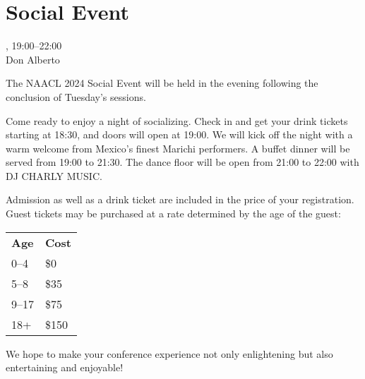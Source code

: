 \clearpage
\section{Social Event}
\setheaders{}{\daydateyear}

\begin{center}



\daydateyear, 19:00--22:00 \vspace{1em}\\
Don Alberto\\
\end{center}


The NAACL 2024 Social Event will be held in the evening following the conclusion of Tuesday's
sessions.

Come ready to enjoy a night of socializing.
Check in and get your drink tickets starting at 18:30, and doors will open at 19:00.
We will kick off the night with a warm welcome from Mexico's finest Marichi performers.
A buffet dinner will be served from 19:00 to 21:30.
The dance floor will be open from 21:00 to 22:00 with DJ CHARLY MUSIC.

Admission as well as a drink ticket are included in the price of your registration.
Guest tickets may be purchased at a rate determined by the age of the guest:

\begin{tabular}{ll}
{\bf Age} & {\bf Cost} \\
0--4 & \$0 \\
5--8 & \$35 \\
9--17 & \$75 \\
18+ & \$150 \\
\end{tabular}

We hope to make your conference experience not only enlightening but also entertaining and
enjoyable!


